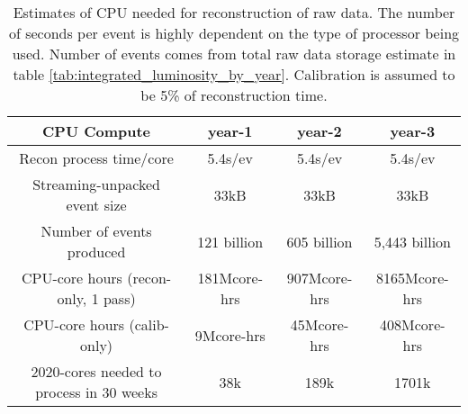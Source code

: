 \begin{table}[htb!]
    \centering
    \begin{tabular}{c|c|c|c}
        \hline
        CPU Compute & year-1 & year-2 & year-3 \\
        \hline
        \hline
        Recon process time/core	& 5.4s/ev	& 5.4s/ev	& 5.4s/ev \\
        \hline
        Streaming-unpacked event size	& 33kB	& 33kB & 33kB \\
        \hline
        Number of events produced &	121 billion	& 605 billion & 5,443 billion \\
        \hline
        CPU-core hours (recon-only, 1 pass)	& 181Mcore-hrs	& 907Mcore-hrs &	8165Mcore-hrs \\
        \hline
        CPU-core hours (calib-only) &	9Mcore-hrs &	45Mcore-hrs &	408Mcore-hrs \\	
        \hline
        2020-cores needed to process in 30 weeks	& 38k &	189k &	1701k \\
        \hline
    \end{tabular}
    \caption{Estimates of CPU needed for reconstruction of raw data. The number of seconds per event is highly dependent on the type of processor being used. Number of events comes from total raw data storage estimate in table \ref{tab:integrated_luminosity_by_year}. Calibration is assumed to be 5\% of reconstruction time.}
    \label{tab:cpu_summary}
\end{table}



